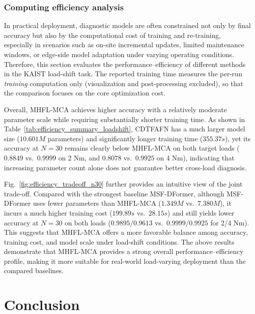 \documentclass[a4paper]{cas-sc}
\begin{document}
\subsubsection{Computing efficiency analysis}
In practical deployment, diagnostic models are often constrained not only by final accuracy but also by the computational cost of training and re-training, especially in scenarios such as on-site incremental updates, limited maintenance windows, or edge-side model adaptation under varying operating conditions. Therefore, this section evaluates the performance--efficiency of different methods in the KAIST load-shift task. The reported training time measures the per-run \emph{training} computation only (visualization and post-processing excluded), so that the comparison focuses on the core optimization cost.

Overall, MHFL-MCA achieves higher accuracy with a relatively moderate parameter scale while requiring substantially shorter training time. As shown in Table~\ref{tab:efficiency_summary_loadshift}, CDTFAFN has a much larger model size ($10.601M$ parameters) and significantly longer training time ($355.37 s$), yet its accuracy at $N=30$ remains clearly below MHFL-MCA on both target loads ($0.8849$ vs.\ $0.9999$ on 2 Nm, and $0.8078$ vs.\ $0.9925$ on 4 Nm), indicating that increasing parameter count alone does not guarantee better cross-load diagnosis.

Fig.~\ref{fig:efficiency_tradeoff_n30} further provides an intuitive view of the joint trade-off. Compared with the strongest baseline MSF-DFormer, although MSF-DFormer uses fewer parameters than MHFL-MCA ($1.349M$ vs.\ $7.380M$), it incurs a much higher training cost ($199.89 s$ vs.\ $28.15 s$) and still yields lower accuracy at $N=30$ on both loads ($0.9895$/$0.9613$ vs.\ $0.9999$/$0.9925$ for 2/4 Nm). This suggests that MHFL-MCA offers a more favorable balance among accuracy, training cost, and model scale under load-shift conditions. The above results demonstrate that MHFL-MCA provides a strong overall performance--efficiency profile, making it more suitable for real-world load-varying deployment than the compared baselines.


\section{Conclusion}
\label{sec:conclusion}
\end{document}
